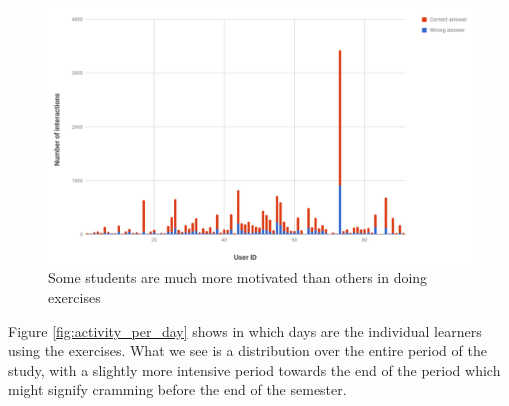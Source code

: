   \begin{figure}[h!]
  \centering
    \includegraphics[width=\columnwidth]{figures/exercise_interactions_count.png}
    \caption{Some students are much more motivated than others in doing exercises }
    \label{fig:ex_interactions}
  \end{figure}



Figure \ref{fig:activity_per_day} shows in which days are the individual learners using the exercises. What we see is a distribution over the entire period of the study, with a slightly more intensive period towards the end of the period which might signify cramming before the end of the semester.

